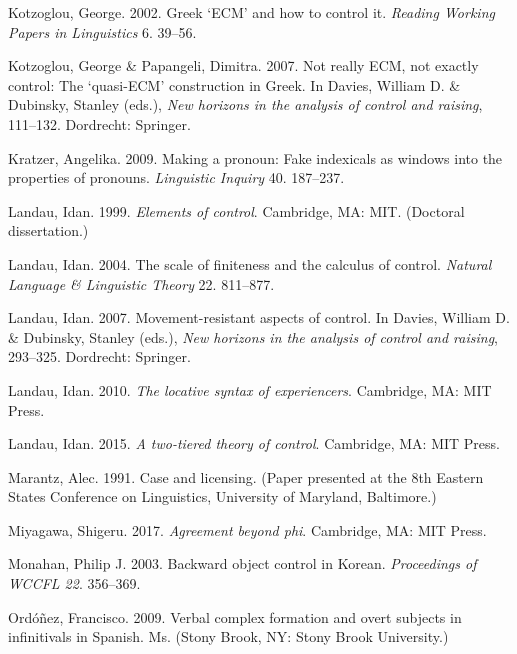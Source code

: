 \documentclass[output=paper]{langsci/langscibook}
\begin{document}
\begin{styleNurTexti}
Kotzoglou, George. 2002. Greek ‘ECM’ and how to control it. \textit{Reading Working Papers in Linguistics} 6. 39–56. 
\end{styleNurTexti}

Kotzoglou, George \& Papangeli, Dimitra. 2007. Not really ECM, not exactly control: The ‘quasi-ECM’ construction in Greek. In Davies, William D. \& Dubinsky, Stanley (eds.), \textit{New horizons in the analysis of control and raising}, 111–132. Dordrecht: Springer. 

Kratzer, Angelika. 2009. Making a pronoun: Fake indexicals as windows into the properties of pronouns. \textit{Linguistic Inquiry} 40. 187–237.

\begin{styleNurTexti}
Landau, Idan. 1999. \textit{Elements of control}. Cambridge, MA: MIT. (Doctoral dissertation.)
\end{styleNurTexti}

\begin{styleNurTexti}
Landau, Idan. 2004. The scale of finiteness and the calculus of control. \textit{Natural Language \& Linguistic Theory} 22. 811–877.
\end{styleNurTexti}

Landau, Idan. 2007. Movement-resistant aspects of control. In Davies, William D. \& Dubinsky, Stanley (eds.), \textit{New horizons in the analysis of control and raising}, 293–325. Dordrecht: Springer.

Landau, Idan. 2010. \textit{The locative syntax of experiencers}. Cambridge, MA: MIT Press.

\begin{stylepi}
Landau, Idan. 2015. \textit{A two-tiered theory of control}. Cambridge, MA: MIT Press.
\end{stylepi}

Marantz, Alec. 1991. Case and licensing. (Paper presented at the 8th Eastern States  Conference on Linguistics, University of Maryland, Baltimore.)

Miyagawa, Shigeru. 2017. \textit{Agreement beyond phi}. Cambridge, MA: MIT Press.

\begin{styleNormalWeb}
Monahan, Philip J. 2003. Backward object control in Korean. \textit{Proceedings of WCCFL 22}. 356–369.
\end{styleNormalWeb}

Ordóñez, Francisco. 2009. Verbal complex formation and overt subjects in infinitivals in Spanish. Ms. (Stony Brook, NY: Stony Brook University.)
\end{document}

